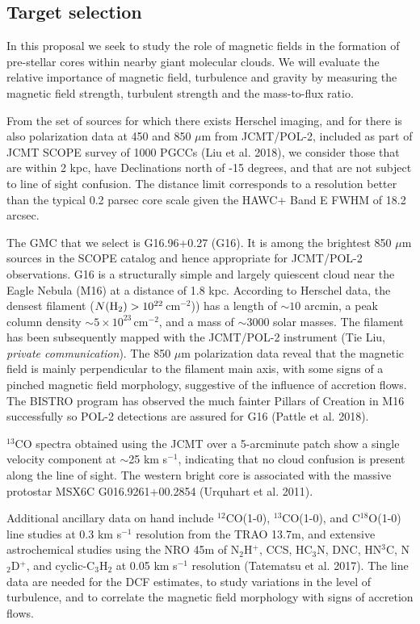 \documentclass[11pt]{amsart}
\begin{document}
{\subsection{Target selection}

In this proposal we seek to study the role of magnetic fields in the formation of pre-stellar cores within 
nearby giant molecular clouds.
We will evaluate the relative importance of magnetic field, turbulence and gravity by measuring the magnetic field strength, turbulent strength and the mass-to-flux ratio.

From the set of sources for which there exists Herschel imaging, and for there is also polarization data at 450 and 850 $\mu$m from JCMT/POL-2, included as part of JCMT SCOPE survey of 1000 PGCCs (Liu et al. 2018), we consider those that are within 2 kpc, have Declinations north of -15 degrees, and that are not subject to line of sight confusion. The distance limit corresponds to a resolution better than the typical 0.2 parsec core scale given the HAWC+ Band E FWHM of 18.2 arcsec. 

The GMC that we select is G16.96+0.27 (G16). It is among the brightest 850 $\mu$m sources in the SCOPE catalog and hence appropriate for JCMT/POL-2 observations. G16 is a structurally simple and largely quiescent cloud near the Eagle Nebula (M16) at a distance of 1.8 kpc. 
According to Herschel data, the densest filament ($N({\rm H_2}) > 10^{22}$\,cm$^{-2}$)) has a length of $\sim 10$ arcmin, a peak column density $\sim 5\times10^{23}$\,cm$^{-2}$, and a mass of $\sim 3000$ solar masses.
The filament has been subsequently mapped with the JCMT/POL-2 instrument (Tie Liu, {\it private communication}). 
The 850 $\mu$m polarization data reveal that the magnetic field is mainly perpendicular to the filament main axis, with some  signs of a pinched magnetic field morphology, suggestive of the influence of accretion flows.
The BISTRO program has observed the much fainter Pillars of Creation in M16 successfully so POL-2 detections are assured for G16 (Pattle et al. 2018).

$^{13}$CO spectra 
obtained using the JCMT over a 5-arcminute patch
show a single velocity component at  $\sim$25 km s$^{-1}$, indicating that no cloud confusion is present along the line of sight. The western bright core is associated with the massive protostar MSX6C G016.9261+00.2854 (Urquhart et al. 2011).

Additional ancillary data on hand include $^{12}$CO(1-0), $^{13}$CO(1-0), and C$^{18}$O(1-0) line studies at 0.3 km s$^{-1}$ resolution from the TRAO 13.7m, 
and extensive astrochemical studies using the NRO 45m of N$_2$H$^+$, CCS, HC$_3$N, DNC, HN$^3$C, N$_2$D$^+$, and cyclic-C$_3$H$_2$ at 
0.05 km s$^{-1}$ resolution (Tatematsu et al. 2017).
The line data are needed for the DCF estimates, to study variations in the level of turbulence, and to correlate the magnetic field morphology with signs of accretion flows.

}
\end{document}
